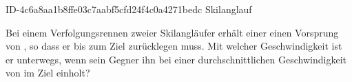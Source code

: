 \begin{exercise}
      {ID-4c6a8aa1b8ffe03c7aabf5cfd24f4c0a4271bedc}
      {Skilanglauf}
  \ifproblem\problem\par
    Bei einem Verfolgungsrennen zweier Skilangläufer erhält einer einen Vorsprung
    von , so dass er bis zum Ziel  zurücklegen muss. Mit
    welcher Geschwindigkeit ist er unterwegs, wenn sein Gegner ihn bei einer
    durchschnittlichen Geschwindigkeit von  im Ziel einholt?
  \fi
\end{exercise}
